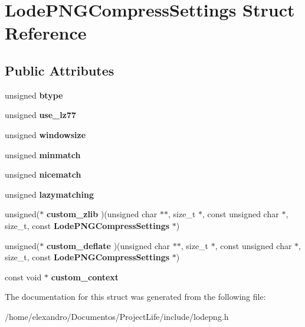 \section{Lode\+P\+N\+G\+Compress\+Settings Struct Reference}
\label{struct_lode_p_n_g_compress_settings}
\subsection*{Public Attributes}
\begin{DoxyCompactItemize}
\item 
\mbox{\label{struct_lode_p_n_g_compress_settings_ac0afeac7276cce01fa9824aa2d5a1ba9}} 
unsigned {\bfseries btype}
\item 
\mbox{\label{struct_lode_p_n_g_compress_settings_a37a87bd874376f0298efad2870e70e7e}} 
unsigned {\bfseries use\+\_\+lz77}
\item 
\mbox{\label{struct_lode_p_n_g_compress_settings_a01e77a9db5c2c4dfe6c79bf04f0bf84e}} 
unsigned {\bfseries windowsize}
\item 
\mbox{\label{struct_lode_p_n_g_compress_settings_a11d89e0ff0c57f1c49dd58cb8347e005}} 
unsigned {\bfseries minmatch}
\item 
\mbox{\label{struct_lode_p_n_g_compress_settings_a70bc37e21eeffead6e9c8d67e163a591}} 
unsigned {\bfseries nicematch}
\item 
\mbox{\label{struct_lode_p_n_g_compress_settings_ad4ffde429dee40a8c314016f5f6fdab5}} 
unsigned {\bfseries lazymatching}
\item 
\mbox{\label{struct_lode_p_n_g_compress_settings_a4a7835f394349f15f1302d11bcb0efa0}} 
unsigned($\ast$ {\bfseries custom\+\_\+zlib} )(unsigned char $\ast$$\ast$, size\+\_\+t $\ast$, const unsigned char $\ast$, size\+\_\+t, const \textbf{ Lode\+P\+N\+G\+Compress\+Settings} $\ast$)
\item 
\mbox{\label{struct_lode_p_n_g_compress_settings_a55dafebbbe017806fb2bbc32bb40a59b}} 
unsigned($\ast$ {\bfseries custom\+\_\+deflate} )(unsigned char $\ast$$\ast$, size\+\_\+t $\ast$, const unsigned char $\ast$, size\+\_\+t, const \textbf{ Lode\+P\+N\+G\+Compress\+Settings} $\ast$)
\item 
\mbox{\label{struct_lode_p_n_g_compress_settings_a62826645ef28e2a84dd2b65f547a2883}} 
const void $\ast$ {\bfseries custom\+\_\+context}
\end{DoxyCompactItemize}


The documentation for this struct was generated from the following file\+:\begin{DoxyCompactItemize}
\item 
/home/elexandro/\+Documentos/\+Project\+Life/include/lodepng.\+h\end{DoxyCompactItemize}
